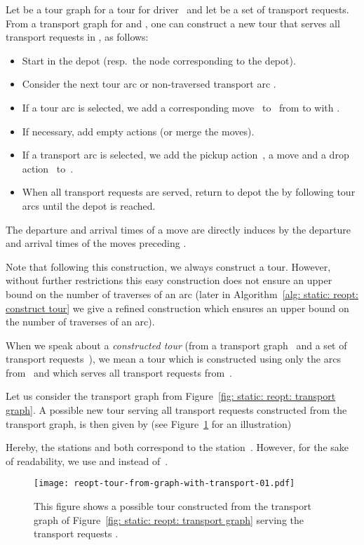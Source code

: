 \documentclass[english]{llncs}
\numberwithin{sublemma}{lemma}
\begin{document}
\begin{remark}\label{rem: static: reopt: construct tour from transport graph}
Let  be a tour graph for a tour  for driver~ and let  be a set of transport requests.
From a transport graph  for  and , one can construct a new tour  that serves all transport requests in , as follows:
\begin{itemize}
 \item Start in the depot  (resp.~the node corresponding to the depot).
 \item Consider the next tour arc  or non-traversed transport arc .
 \item If a tour arc  is selected, we add a corresponding move~ to~ from  to  with .
 \item If necessary, add empty actions (or merge the moves).
 \item If a transport arc  is selected, we add the pickup action~, a move  and a drop action~ to~.
 \item When all transport requests are served, return to depot the by following tour arcs until the depot is reached.
\end{itemize}
The departure and arrival times of a move  are directly induces by the departure and arrival times of the moves preceding .

Note that following this construction, we always construct a tour.
However, without further restrictions
this easy construction
does not ensure an upper bound on the number of traverses of an arc
(later in Algorithm~\ref{alg: static: reopt: construct tour} we give a refined construction which ensures an upper bound on the number of traverses of an arc).
\end{remark}



When we speak about a \emph{constructed tour} (from a transport graph~ and a set of transport requests~),
we mean a tour  which is constructed using only the arcs from~ and which serves all transport requests from~.


\begin{example}\label{ex: static: reopt: tour from transport graph}
Let us consider the transport graph from Figure~\ref{fig: static: reopt: transport graph}.
A possible new tour serving all transport requests  constructed from the transport graph, is then given by (see Figure~\ref{fig: static: reopt: tour from transport graph} for an illustration)

Hereby, the stations  and  both correspond to the station~.
However, for the sake of readability, we use  and  instead of~.
\begin{figure}[ht]
    \centering
    \texttt{[image: reopt-tour-from-graph-with-transport-01.pdf]}
 \caption{
  This figure shows a possible tour constructed from the transport graph of Figure~\ref{fig: static: reopt: transport graph} serving the transport requests .
 }
 \label{fig: static: reopt: tour from transport graph}
\end{figure}
\end{example}
\end{document}
